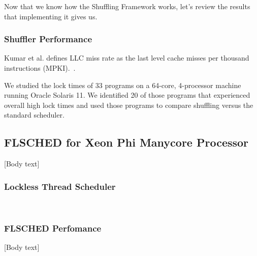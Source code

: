 \documentclass{sig-alternate}
\begin{document}
Now that we know how the Shuffling Framework works, let's review the results that implementing it gives us.

\subsubsection{Shuffler Performance}
\label{sec:shuf_performance}

Kumar et al. defines LLC miss rate as the last level cache misses per thousand instructions (MPKI).~\cite{KumarEtal:2014}.

We studied the lock times of 33 programs on a 64-core, 4-processor machine running Oracle Solaris 11. We identified 20 of those programs that experienced overall high lock times and used those programs to compare shuffling versus the standard scheduler.~\cite{KumarEtal:2014}



\subsection{FLSCHED for Xeon Phi Manycore Processor}
\label{sec:flsched}



[Body text]

\subsubsection{Lockless Thread Scheduler}
\label{sec:flsched_about}

\cite{Lozi:2016, NisarEtal:2017}
~\cite{KumarEtal:2014}

\subsubsection{FLSCHED Perfomance}
\label{sec:flsched_performance}

[Body text]
\end{document}
